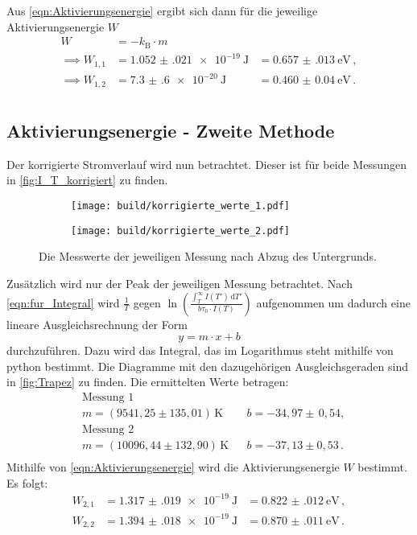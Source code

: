   \noindent
  Aus \eqref{eqn:Aktivierungsenergie} ergibt sich dann für die jeweilige Aktivierungsenergie $W$
  \begin{align*}
    W   &= -k_\text{B} \cdot m \\
    \implies W_{1,1} &= \SI{1.052(021)e-19}{\joule} &= \SI{0.657(013)}{\electronvolt} \, , \\
    \implies W_{1,2} &= \SI{7.3(6)e-20}{\joule} &= \SI{0.460(40)}{\electronvolt}  \, .\\
  \end{align*}

\subsection{Aktivierungsenergie - Zweite Methode}
  Der korrigierte Stromverlauf wird nun betrachtet.
  Dieser ist für beide Messungen in \autoref{fig:I_T_korrigiert} zu finden.

  \begin{figure}[H]
    \begin{subfigure}[b]{.5\linewidth}
      \centering
      \texttt{[image: build/korrigierte\_werte\_1.pdf]}
    \end{subfigure}
    \begin{subfigure}[b]{.5\linewidth}
      \centering
      \texttt{[image: build/korrigierte\_werte\_2.pdf]}
    \end{subfigure}
    \caption{Die Messwerte der jeweiligen Messung nach Abzug des Untergrunds.}
    \label{fig:I_T_korrigiert}
  \end{figure} %

  \noindent
  Zusätzlich wird nur der Peak der jeweiligen Messung betrachtet.
  Nach \eqref{eqn:fur_Integral} wird $\frac{1}{T}$ gegen $\ln\left( \frac{\int_T^\infty I(T') \, \text{d}T'}{b \tau_0 \cdot I(T)}\right)$ aufgenommen um dadurch eine lineare Ausgleichsrechnung der Form
  \begin{equation*}
    y = m \cdot x + b 
  \end{equation*}
  durchzuführen.
  Dazu wird das Integral, das im Logarithmus steht mithilfe von python bestimmt.
  Die Diagramme mit den dazugehörigen Ausgleichsgeraden sind in \autoref{fig:Trapez} zu finden.
  Die ermittelten Werte betragen:
  \begin{align*}
    &\text{Messung 1} \\
    &m = (9541,25 \pm 135,01)\,\si{\kelvin} && b= -34,97 \pm  \, 0,54 , \\ 
    &\text{Messung 2} \\
    &m = (10096,44 \pm 132,90)\,\si{\kelvin} && b = -37,13 \pm 0,53\, . \\ %
  \end{align*}
  \noindent
  Mithilfe von \eqref{eqn:Aktivierungsenergie} wird die Aktivierungsenergie $W$ bestimmt.
  Es folgt:
  \begin{align*}
    W_{2,1} &= \SI{1.317(019)e-19}{\joule} &= \SI{0.822(012)}{\electronvolt} \, ,\\
    W_{2,2} &= \SI{1.394(018)e-19}{\joule} &= \SI{0.870(011)}{\electronvolt} \, .\\ %
  \end{align*}

